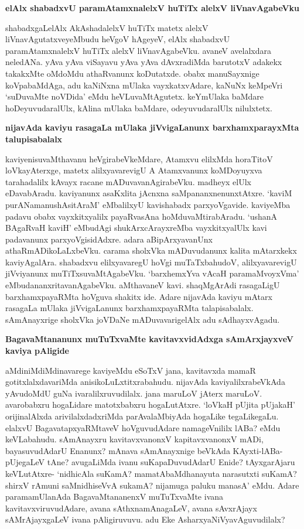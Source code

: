 {\bigskip
\noindent
{\large\bf elAlx shabadxvU paramAtamxnalelxV huTiTx alelxV liVnavAgabeVku}}\label{page182}
\medskip

\noindent
shabadxgaLelAlx AkAshadalelxV huTiTx matetx alelxV liVnavAgutatxveyeMbudu heVgoV hAgeyeV, elAlx shabadx\-vU paramAtamxnalelxV huTiTx alelxV liVnavAgabeVku. avaneV avelalxdara neledANa. yAva yAva viSa\-yavu yAva yAva dAvxradiMda barutotxV adakekx takakxMte oMdoMdu athaRvanunx koDutatxde. obabx manuSayx\-nige koVpabaMdAga, adu kaNiNxna mUlaka vayxkatxvAdare, kaNuNx keMpeVri `suDuvaMte noVDida' eMdu heVLu\-vaMtAgutetx. keYmUlaka baMdare hoDeyuvudaralUlx, kAlina mUlaka baMdare, odeyuvuda\-ralUlx nilulxtetx. 

{\bigskip
\noindent
{\large\bf nijavAda kaviyu rasagaLa mUlaka jiVvigaLanunx barxhamxparayxMta talupisabalalx}}\label{page183}
\medskip

\noindent
kaviyenisuvaMthavanu heVgirabeVkeMdare, Atamxvu elilxMda horaTitoV loVka\-yAterxge, matetx alilxya\-varevigU A Atamxvanunx koMDoyuyxva tarahadalilx kAvayx racane mADuvavanAgirabeVku. madheyx elUlx eDava\-bAradu. kaviyanunx asaKxlita jAcnxna saMpananxnenunxtAtxre. `kaviM purANamanushAsitAraM'\label{239} eMba\-lilxyU kavishabadx parxyoVgavide. kaviyeMba padavu obabx vayxkitxyalilx payaRvasAna hoMduvaMtirabA\-radu. `ushanA BAgaRvaH kaviH' eMbudAgi shukArxcArayxreMba vayxkitxyalUlx kavi padavanunx parxyoVgisidAdxre. adara aBipArxyavanUnx athaRmADikoLaLxbeVku. carama sholxVka mADuvudanunx kalita mAtarxkekx kaviyAga\-lAra. shabadxvu elilxyavaregU hoVgi muTaTxbahudoV, alilxyavarevigU jiVviyanunx muTiTxsuvaMtAga\-beVku. `barxhemxYva vAcaH paramaMvoyxVma'\label{183} eMbudananxritavanAgabeVku. aMthavaneV kavi. shaqMgA\-rAdi rasa\-gaLigU barxhamxpayaRMta hoVguva shakitx ide. Adare nijavAda kaviyu mAtarx rasagaLa mUlaka jiVvigaLanunx barxhamxpayaRMta talapisabalalx. sAmAnayxrige sholxVka joVDaNe mADuvavarigelAlx adu sAdhayxvAgadu.

\newpage

{\bigskip
\noindent
{\large\bf BagavaMtananunx muTuTxvaMte kavitavxvidAdxga sAmArxjayxveV kaviya pAligide}}\label{page183}
\medskip

\noindent
aMdiniMdiMdinavarege kaviyeMdu eSoTxV jana, kavitavxda mamaR gotitxlalxdavariMda anisikoLuLx\-titxrabahudu. nijavAda kaviyalilxrabeVkAda yAvudoMdU guNa ivaralilxruvudilalx. jana maruLoV jAterx maruLoV. avarobabxru hogaLidare matotxbabxru hogaLutAtxre. `loVkaH pUjita pUjakaH'\label{183} oriji\-nalAlxda arivilalxdadxriMda parAvalaMbiyAda hogaLike tegaLikegaLu. elalxvU BagavatapxyaRMtaveV hoVgu\-vudAdare namageVnililx lABa? eMdu keVLabahudu. sAmAnayxru kavitavxvanonxV kapitavxvanonxV mADi, bayasuvudAdarU Enanunx? mAnava sAmAnayxnige beVkAda KAyxti-lABa-pUjegaLeV tAne? avu\-gaLiMda ivanu suKapaDuvudAdarU Enide? tAyxgarAjaru keVLutAtxre- `nidhicAla suKamA? mamatA\-baMdhanayuta narasutxti suKamA? shirxV rAmuni saMnidhiseVvA sukamA? nijamuga paluku manasA' eMdu. Adare paramamUlanAda BagavaMtananenxV muTuTxvaMte ivana kavitavxviruvudAdare, avana sAthxna\-mAnagaLeV, avana sAvxrAjayx sAMrAjayxgaLeV ivana pAligiruvuvu. adu Eke AsharxyaNiVyavAguvudilalx?

